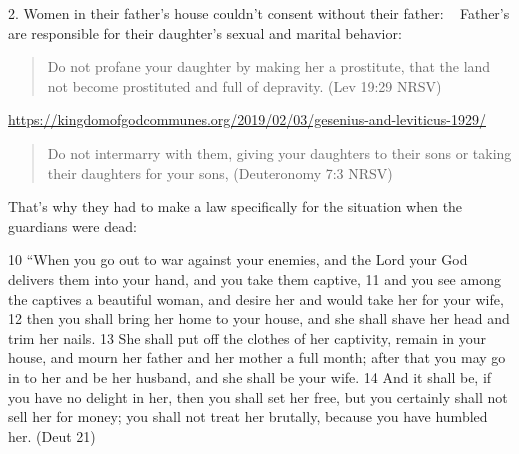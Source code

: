 \documentclass[11pt]{article}
\begin{document}
2. Women in their father’s house couldn't consent without their father: 
 
Father’s are responsible for their daughter’s sexual and marital behavior:
\begin{quote}
Do not profane your daughter by making her a prostitute, that the land not become prostituted and full of depravity. (Lev 19:29 NRSV)
\end{quote}



\url{https://kingdomofgodcommunes.org/2019/02/03/gesenius-and-leviticus-1929/}

\begin{quote}
Do not intermarry with them, giving your daughters to their sons or taking their daughters for your sons,
(Deuteronomy 7:3 NRSV)
\end{quote}


That’s why they had to make a law specifically for the situation when the guardians were dead:


10 “When you go out to war against your enemies, and the Lord your God delivers them into your hand, and you take them captive, 11 and you see among the captives a beautiful woman, and desire her and would take her for your wife, 12 then you shall bring her home to your house, and she shall shave her head and trim her nails. 13 She shall put off the clothes of her captivity, remain in your house, and mourn her father and her mother a full month; after that you may go in to her and be her husband, and she shall be your wife. 14 And it shall be, if you have no delight in her, then you shall set her free, but you certainly shall not sell her for money; you shall not treat her brutally, because you have humbled her. (Deut 21)
\end{document}
